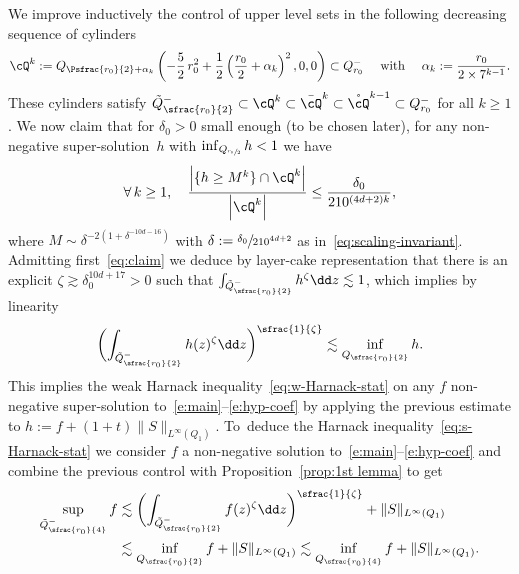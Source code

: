 We improve inductively the control of upper level sets in the
following decreasing sequence of cylinders
\begin{equation*}
\cQ^k:= Q_{\Psfrac{r_0}{2}+\alpha_k} \left(-\frac{5}{2}\, r_0^2 +
\frac12 \left( \frac{r_0}{2}+\alpha_k \right)^2,0,0 \right)\subset
Q_{r_0}^{-} \quad \text{ with } \quad
\alpha_k:=\frac{r_0}{2\times 7^{k-1}}.
\end{equation*}
These cylinders satisfy
$\tilde Q^-_{\sfrac{r_0}{2}} \subset \cQ^k \subset \bar \cQ^k
\subset \mathring{\cQ}^{k-1} \subset Q^- _{r_0}$ for all
$k \ge 1$. We now claim that for $\delta_0>0$ small enough (to be
chosen later), for any non-negative super-solution~$h$ with
$\inf_{Q_{\sfrac{r_0}{2}}} h <1$ we have
\begin{align}
\label{eq:claim}
\forall \, k \ge 1, \quad
\frac{\left| \{ h \ge M^k \} \cap \cQ^k \right|}{\left|
\cQ^k \right|} \le \frac{\delta_0}{210^{(4d+2)k}},
\end{align}
where $M \sim \delta^{-2 (1+\delta^{-10d-16})}$ with
$\delta:=\sfrac{\delta_0}{210^{4d+2}}$ as
in~\eqref{eq:scaling-invariant}. Admitting first~\eqref{eq:claim}
we deduce by layer-cake representation that
there is an explicit $\zeta \gtrsim \delta_0^{10d+17}>0$ such
that $\int_{\tilde Q_{\sfrac{r_0}{2}}^{-}} h^\zeta \dd z \lesssim
1$, which implies by linearity
\[
\biggl( \int_{\tilde Q_{\sfrac{r_0}{2}}^{-}} h(z)^\zeta \dd z
\biggr)^{\sfrac{1}{\zeta}} \lesssim \inf_{Q_{\sfrac{r_0}{2}}} h.
\]
This implies the weak Harnack
inequality~\eqref{eq:w-Harnack-stat} on any $f$ non-negative
super-solution to~\eqref{e:main}--\eqref{e:hyp-coef} by applying
the previous estimate to $h := f + (1+t) \|
S\|_{L^\infty(Q_1)}$. To~deduce the Harnack
inequality~\eqref{eq:s-Harnack-stat} we consider $f$ a
non-negative solution to~\eqref{e:main}--\eqref{e:hyp-coef} and
combine the previous control with Proposition~\ref{prop:1st
lemma} to get
\begin{align*}
\sup_{\tilde Q_{\sfrac{r_0}{4}}^{-}} f &\lesssim
\biggl( \int_{\tilde Q_{\sfrac{r_0}{2}}^{-}} f(z)^\zeta \dd z
\biggr)^{\sfrac{1}{\zeta}} + \| S\|_{L^\infty(Q_1)}\\
&\lesssim
\inf_{Q_{\sfrac{r_0}{2}}} f + \| S\|_{L^\infty(Q_1)} \lesssim
\inf_{Q_{\sfrac{r_0}{4}}} f + \| S\|_{L^\infty(Q_1)}.
\end{align*}

